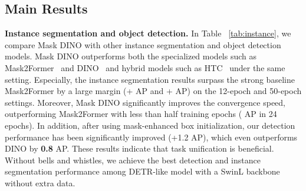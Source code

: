 \documentclass[10pt,twocolumn,letterpaper]{article}
\begin{document}
\subsection{Main Results}\label{sec:main}
\noindent\textbf{Instance segmentation and object detection.} In Table ~\ref{tab:instance}, we compare Mask DINO with other instance segmentation and object detection models. Mask DINO outperforms both the specialized models such as Mask2Former~\cite{cheng2021mask2former} and DINO~\cite{zhang2022dino} and hybrid models such as HTC~\cite{chen2019hybrid} under the same setting. Especially, the instance segmentation results surpass the strong baseline Mask2Former by a large margin (+ AP and + AP)  on the 12-epoch and 50-epoch settings. Moreover, Mask DINO significantly improves the convergence speed, outperforming Mask2Former with less than half training epochs ( AP in 24 epochs). 
In addition, after using mask-enhanced box initialization, our detection performance has been significantly improved (+1.2 AP), which even outperforms DINO by \textbf{0.8} AP. These results indicate that task unification is beneficial. Without bells and whistles, we achieve the best detection and instance segmentation performance among DETR-like model with a SwinL backbone without extra data.
\end{document}
